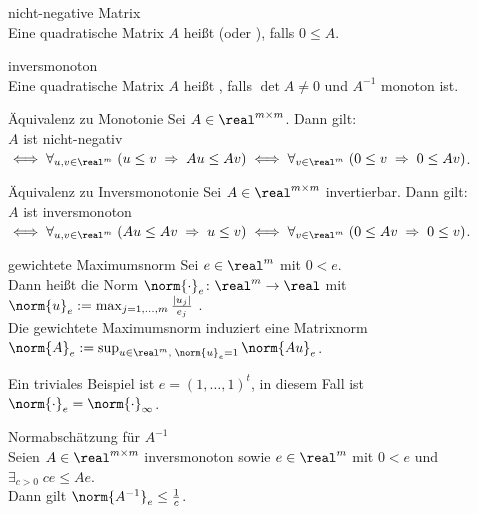 \begin{Def}{nicht-negative Matrix}\\
    Eine quadratische Matrix $A$ heißt 
    (oder ), falls $0 \le A$.
\end{Def}

\begin{Def}{inversmonoton}\\
    Eine quadratische Matrix $A$ heißt ,
    falls $\det A \not= 0$ und $A^{-1}$ monoton ist.
\end{Def}

\begin{Satz}{Äquivalenz zu Monotonie}
    Sei $A \in \real^{m \times m}$.
    Dann gilt:\\
    $A$ ist nicht-negativ $\iff
    \forall_{u, v \in \real^m}\; (u \le v \;\Rightarrow\; Au \le Av) \iff
    \forall_{v \in \real^m}\; (0 \le v \;\Rightarrow\; 0 \le Av)$.
\end{Satz}

\begin{Satz}{Äquivalenz zu Inversmonotonie}
    Sei $A \in \real^{m \times m}$ invertierbar.
    Dann gilt:\\
    $A$ ist inversmonoton $\iff
    \forall_{u, v \in \real^m}\; (Au \le Av \;\Rightarrow\; u \le v) \iff
    \forall_{v \in \real^m}\; (0 \le Av \;\Rightarrow\; 0 \le v)$.
\end{Satz}

\linie
\pagebreak

\begin{Def}{gewichtete Maximumsnorm}
    Sei $e \in \real^m$ mit $0 < e$.\\
    Dann heißt die Norm $\norm{\cdot}_e\colon \real^m \rightarrow \real$
    mit $\norm{u}_e := \max_{j=1,\dotsc,m} \frac{|u_j|}{e_j}$
    .\\
    Die gewichtete Maximumsnorm induziert eine Matrixnorm
    $\norm{A}_e := \sup_{u \in \real^m,\; \norm{u}_e = 1} \norm{Au}_e$.
\end{Def}

\begin{Bsp}
    Ein triviales Beispiel ist $e = (1, \dotsc, 1)^t$, in diesem Fall ist
    $\norm{\cdot}_e = \norm{\cdot}_\infty$.
\end{Bsp}

\begin{Satz}{Normabschätzung für $A^{-1}$}\\
    Seien $A \in \real^{m \times m}$ inversmonoton sowie
    $e \in \real^m$ mit $0 < e$ und $\exists_{c > 0}\; ce \le Ae$.\\
    Dann gilt $\norm{A^{-1}}_e \le \frac{1}{c}$.
\end{Satz}

